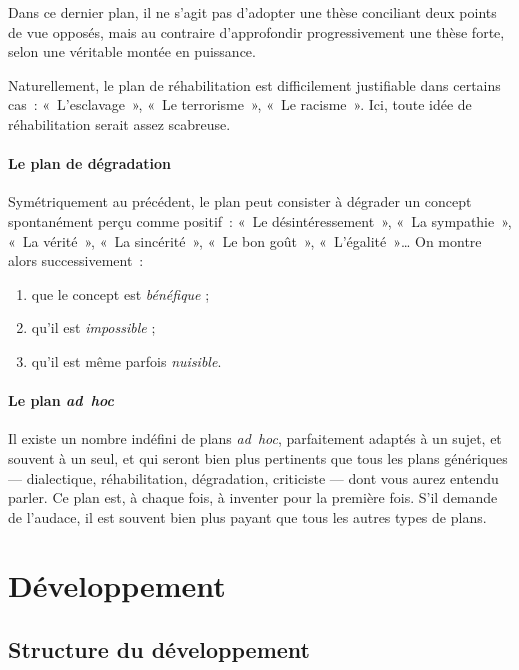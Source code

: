 \documentclass[a4paper,12pt]{article}
\begin{document}
Dans ce dernier plan, il ne s'agit pas d'adopter une thèse conciliant
deux points de vue opposés, mais au contraire d'approfondir
progressivement une thèse forte, selon une véritable montée en
puissance.

Naturellement, le plan de réhabilitation est difficilement justifiable
dans certains cas : « L'esclavage », « Le terrorisme », « Le racisme ». Ici,
toute idée de réhabilitation serait assez scabreuse.

\paragraph{Le plan de dégradation}
\label{sec-2-4-2-4}

Symétriquement au précédent, le plan peut consister à dégrader un
concept spontanément perçu comme positif : « Le désintéressement », « La
sympathie », « La vérité », « La sincérité », « Le bon goût », « L'égalité »\ldots{}
On montre alors successivement :

\begin{enumerate}
\item que le concept est \emph{bénéfique} ;

\item qu'il est \emph{impossible} ;

\item qu'il est même parfois \emph{nuisible}.
\end{enumerate}

\paragraph{Le plan \emph{ad hoc}}
\label{sec-2-4-2-5}

Il existe un nombre indéfini de plans \emph{ad hoc}, parfaitement adaptés à
un sujet, et souvent à un seul, et qui seront bien plus pertinents que
tous les plans génériques --- dialectique, réhabilitation, dégradation,
criticiste --- dont vous aurez entendu parler. Ce plan est, à chaque
fois, à inventer pour la première fois. S'il demande de l'audace, il est
souvent bien plus payant que tous les autres types de plans.



\section{Développement}
\label{sec-3}

\subsection{Structure du développement}
\label{sec-3-1}
\end{document}
